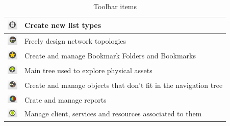 \documentclass[a4paper]{article}
\begin{document}
\begin{table}[h!]
\begin{tabular}{cl}
			\midrule
			\includegraphics[width=0.5cm]{img/icon_list_type_manager.png} & Create new list types\\
			\midrule
			\includegraphics[width=0.5cm]{img/icon_topology_designer.png} & Freely design network topologies\\
			\midrule
			\includegraphics[width=0.5cm]{img/icon_bookmarks.png} & Create and manage Bookmark Folders and Bookmarks\\
			\midrule
			\includegraphics[width=0.5cm]{img/icon_navigation_tree.png} & Main tree used to explore physical assets\\
			\midrule
			\includegraphics[width=0.5cm]{img/icon_pools_manager.png} & Create and manage objects that don't fit in the navigation tree\\
			\midrule
			\includegraphics[width=0.5cm]{img/icon_reports.png} & Crate and manage reports\\
			\midrule
			\includegraphics[width=0.5cm]{img/icon_service_manager.png} & Manage client, services and resources associated to them\\
		\end{tabular}	
		\caption{Toolbar items}
		\label{tab:toolbar_icons}
	\end{table}
	
	\newpage
\end{document}
